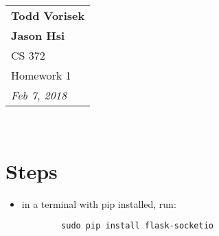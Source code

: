 \documentclass{article}
\begin{document}
  \null\hfill
  \begin{tabular}[t]{l@{}}
    \textbf{Todd Vorisek}\\
    \textbf{Jason Hsi} \\
    CS 372 \\
    Homework 1\\
    \textit{Feb 7, 2018} \\
  \end{tabular}\\

  \section*{Steps}
    \begin{itemize}
      \item in a terminal with pip installed, run: \begin{lstlisting}
        sudo pip install flask-socketio \end{lstlisting}
    \end{itemize}
\end{document}
